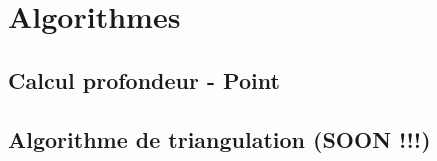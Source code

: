 \documentclass{article}
\begin{document}
\newpage

\section{Algorithmes}
  
\subsection{Calcul profondeur - Point}

\subsection{Algorithme de triangulation (SOON !!!)} 
\end{document}
